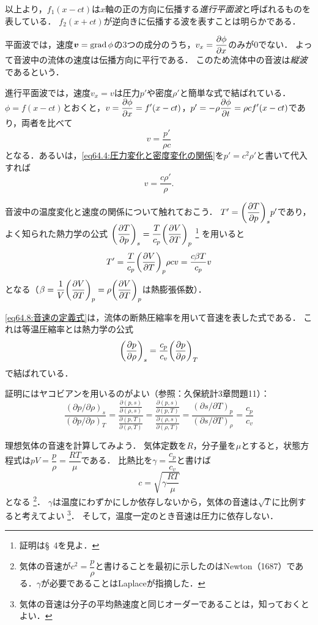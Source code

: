以上より，$f_1(x-ct)$は$x$軸の正の方向に伝播する\emph{進行平面波}と呼ばれるものを表している．
$f_2(x+ct)$が逆向きに伝播する波を表すことは明らかである．


平面波では，速度$\vb*{v}=\operatorname{grad}\phi$の3つの成分のうち，$v_x=\dpdv{\phi}{x}$のみが0でない．
よって音波中の流体の速度は伝播方向に平行である．
このため流体中の音波は\emph{縦波}であるという．

進行平面波では，速度$v_x=v$は圧力$p'$や密度$\rho'$と簡単な式で結ばれている．
$\phi=f(x-ct)$とおくと，$v=\dpdv{\phi}{x} = f'(x-ct)$，$p'=-\rho\dpdv{\phi}{t} = \rho c f'(x-ct)$であり，両者を比べて
\begin{equation}
    v = \frac{p'}{\rho c}
\end{equation}
となる．あるいは，\eqref{eq64.4:圧力変化と密度変化の関係}を$p'=c^2\rho'$と書いて代入すれば
\begin{equation}\label{eq64.12:速度と密度変化の関係}
    v = \frac{c \rho'}{\rho}.
\end{equation}


音波中の温度変化と速度の関係について触れておこう．
$T' = \dPDV{T}{p}{s}p'$であり，よく知られた熱力学の公式
$\dPDV{T}{p}{s} = \dfrac{T}{c_p}\dPDV{V}{T}{p}$
\footnote{証明は\S~4を見よ．}
を用いると
\begin{equation}
    T' = \frac{T}{c_p}\PDV{V}{T}{p}\rho cv = \frac{c\beta T}{c_p} v
\end{equation}
となる（$\beta=\dfrac{1}{V}\dPDV{V}{T}{p}=\rho\dPDV{V}{T}{p}$は熱膨張係数）．


\eqref{eq64.8:音速の定義式}は，流体の断熱圧縮率を用いて音速を表した式である．
これは等温圧縮率とは熱力学の公式
\begin{equation}
    \PDV{p}{\rho}{s} = \frac{c_p}{c_v}\PDV{p}{\rho}{T}
\end{equation}
で結ばれている．
\begin{details}
証明にはヤコビアンを用いるのがよい（参照：久保統計3章問題11）：
\[
    \frac{(\partial p/\partial\rho)_s}{(\partial p/\partial\rho)_T}
    = \frac{ \frac{\partial(p,s)}{\partial(\rho,s)} }{ \frac{\partial(p,T)}{\partial(\rho,T)} }
    = \frac{ \frac{\partial(p,s)}{\partial(p,T)} }{ \frac{\partial(\rho,s)}{\partial(\rho,T)} }
    = \frac{(\partial s/\partial T)_p}{(\partial s/\partial T)_\rho} = \frac{c_p}{c_v}
\]
\end{details}
\noindent%
理想気体の音速を計算してみよう．
気体定数を$R$，分子量を$\mu$とすると，状態方程式は$pV=\dfrac{p}{\rho}=\dfrac{RT}{\mu}$である．
比熱比を$\gamma=\dfrac{c_p}{c_v}$と書けば
\begin{equation}
    c = \sqrt{\gamma\frac{RT}{\mu}}
\end{equation}
となる
\footnote{気体の音速が$c^2=\dfrac{p}{\rho}$と書けることを最初に示したのはNewton（1687）である．$\gamma$が必要であることはLaplaceが指摘した．}．
$\gamma$は温度にわずかにしか依存しないから，気体の音速は$\sqrt{T}$に比例すると考えてよい
\footnote{気体の音速は分子の平均熱速度と同じオーダーであることは，知っておくとよい．}．
そして，温度一定のとき音速は圧力に依存しない．




